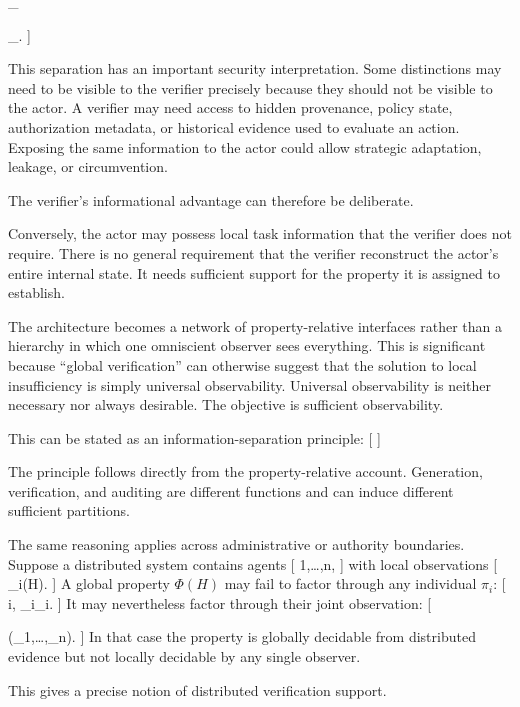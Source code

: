 \documentclass[11pt]{article}
\begin{document}
\pi_{}

\pi_{}.
]

This separation has an important security interpretation. Some distinctions may need to be visible to the verifier precisely because they should not be visible to the actor. A verifier may need access to hidden provenance, policy state, authorization metadata, or historical evidence used to evaluate an action. Exposing the same information to the actor could allow strategic adaptation, leakage, or circumvention.

The verifier's informational advantage can therefore be deliberate.

Conversely, the actor may possess local task information that the verifier does not require. There is no general requirement that the verifier reconstruct the actor's entire internal state. It needs sufficient support for the property it is assigned to establish.

The architecture becomes a network of property-relative interfaces rather than a hierarchy in which one omniscient observer sees everything. This is significant because ``global verification'' can otherwise suggest that the solution to local insufficiency is simply universal observability. Universal observability is neither necessary nor always desirable. The objective is sufficient observability.

This can be stated as an information-separation principle:
[
]

The principle follows directly from the property-relative account. Generation, verification, and auditing are different functions and can induce different sufficient partitions.

The same reasoning applies across administrative or authority boundaries. Suppose a distributed system contains agents
[
1,\ldots,n,
]
with local observations
[
\pi_i(H).
]
A global property $\Phi(H)$ may fail to factor through any individual $\pi_i$:
[
\forall i,\qquad
\Phi\neq\widehat{\Phi}_i\circ\pi_i.
]
It may nevertheless factor through their joint observation:
[
\Phi

\widehat{\Phi}
\circ
(\pi_1,\ldots,\pi_n).
]
In that case the property is globally decidable from distributed evidence but not locally decidable by any single observer.

This gives a precise notion of distributed verification support.
\end{document}
